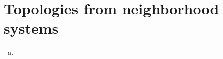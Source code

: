 \section{Topologies from neighborhood systems}
\label{exercises:01-B}

\begin{enumerate}[(a)]
  \item
\end{enumerate}
